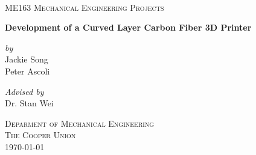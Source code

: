 \begin{titlepage}
\center 

\hfill\\
\vspace{2cm}
\textsc{\LARGE ME163 Mechanical Engineering Projects} \\ 

\vspace{2.5cm} 

{\huge \bfseries Development of a Curved Layer Carbon Fiber 3D Printer}\\[0.4cm] %

\vspace{1.5cm} 
 
\large
\emph{by} \\
Jackie Song \\
Peter Ascoli

\vspace{1cm}

\large
\emph{Advised by} \\
Dr. Stan Wei 

\vspace{1.5cm} 

\textsc{\Large Deparment of Mechanical Engineering} \\
\textsc{\large The Cooper Union} \\
{\large \today} \\
\vfill 

\end{titlepage}
